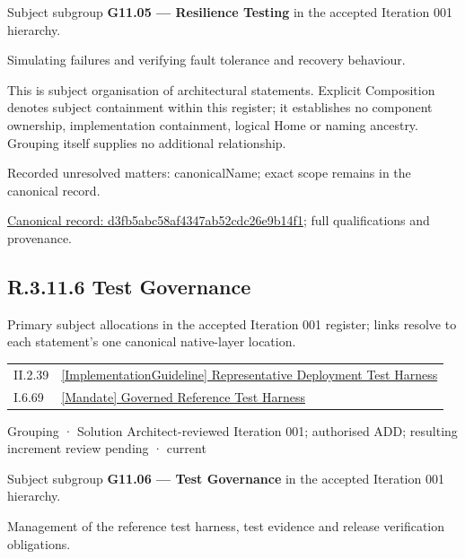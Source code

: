 Subject subgroup \textbf{G11.05 — Resilience Testing} in the accepted Iteration 001 hierarchy.



Simulating failures and verifying fault tolerance and recovery behaviour.



This is subject organisation of architectural statements. Explicit Composition denotes subject containment within this register; it establishes no component ownership, implementation containment, logical Home or naming ancestry. Grouping itself supplies no additional relationship.


{\small Recorded unresolved matters: canonicalName; exact scope remains in the canonical record.}\par
{\footnotesize \href{../../../../continuum/grouping/d3fb5abc58af4347ab52cdc26e9b14f1.md}{Canonical record: d3fb5abc58af4347ab52cdc26e9b14f1}; full qualifications and provenance.}\par
\subsection*{R.3.11.6 Test Governance}
\label{navigation:R.3.11.6}

Primary subject allocations in the accepted Iteration 001 register; links resolve to each statement’s one canonical native-layer location.\par
\begin{longtable}{p{.22\linewidth}p{.73\linewidth}}
II.2.39 & \hyperref[element:13ce74b78d624dd09c4401fafc911f67]{[ImplementationGuideline] Representative Deployment Test Harness} \\
I.6.69 & \hyperref[element:5ce1ef8baaf84848979ff6c9ccf6ca91]{[Mandate] Governed Reference Test Harness} \\
\end{longtable}
\label{element:7eceab6d8a9741708d438a7760103c69}
{\small Grouping · Solution Architect-reviewed Iteration 001; authorised ADD; resulting increment review pending · current}\par

Subject subgroup \textbf{G11.06 — Test Governance} in the accepted Iteration 001 hierarchy.



Management of the reference test harness, test evidence and release verification obligations.



